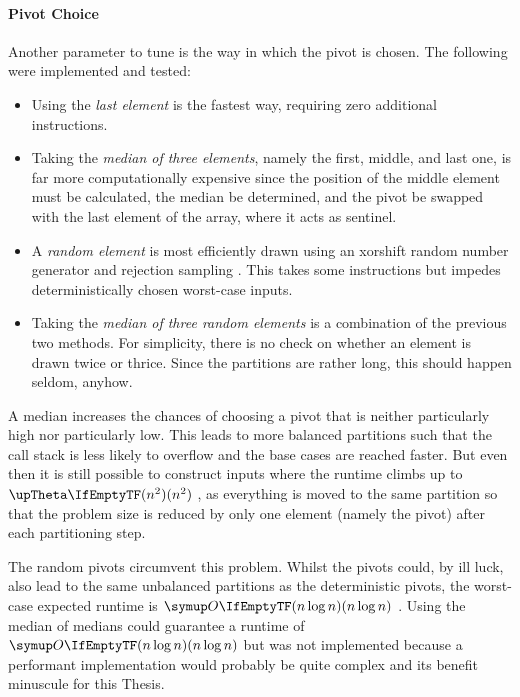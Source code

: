 \paragraph{Pivot Choice}
Another parameter to tune is the way in which the pivot is chosen.
The following were implemented and tested:
\begin{itemize}
	\item
	Using the \emph{last element} is the fastest way, requiring zero additional instructions.

	\item
	Taking the \emph{median of three elements}, namely the first, middle, and last one, is far more computationally expensive since the position of the middle element must be calculated, the median be determined, and the pivot be swapped with the last element of the array, where it acts as sentinel.

	\item
	A \emph{random element} is most efficiently drawn using an xorshift random number generator and rejection sampling \cite{lukas_geis}.
	This takes some instructions but impedes deterministically chosen worst-case inputs.

	\item
	Taking the \emph{median of three random elements} is a combination of the previous two methods.
	For simplicity, there is no check on whether an element is drawn twice or thrice.
	Since the partitions are rather long, this should happen seldom, anyhow.
\end{itemize}
A median increases the chances of choosing a pivot that is neither particularly high nor particularly low.
This leads to more balanced partitions such that the call stack is less likely to overflow and the base cases are reached faster.
But even then it is still possible to construct inputs where the runtime climbs up to \(\bigtheta{n^2}\) \cite{erkiö1984worstcase}, as everything is moved to the same partition so that the problem size is reduced by only one element (namely the pivot) after each partitioning step.

The random pivots circumvent this problem.
Whilst the pivots could, by ill luck, also lead to the same unbalanced partitions as the deterministic pivots, the worst-case expected runtime is \(\bigoh{n \log n}\) \cite{blum2011probabilistic}.
Using the median of medians \cite{blum1973median} could guarantee a runtime of \(\bigoh{n \log n}\) but was not implemented because a performant implementation would probably be quite complex and its benefit minuscule for this Thesis.

